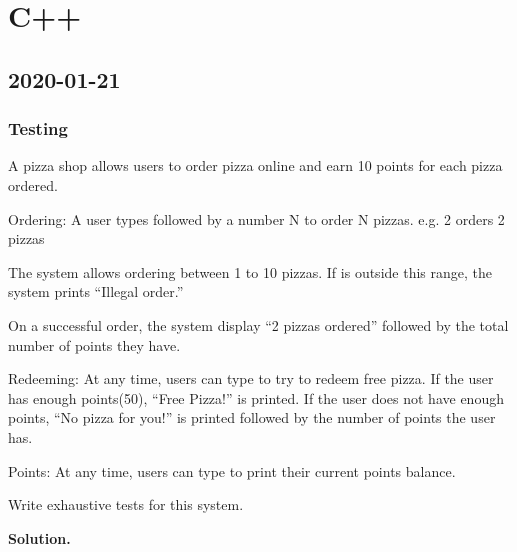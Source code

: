 \chapter{C++}
\section{2020-01-21}
\subsection{Testing}
A pizza shop allows users to order pizza online and earn 10 points for each pizza
ordered.

Ordering: A user types  followed by a number N to order N pizzas.
e.g.  2 orders 2 pizzas

The system allows ordering between 1 to 10 pizzas.
If  is outside this range, the system prints ``Illegal order.''

On a successful order, the system display ``2 pizzas ordered''
followed by the total number of points they have.

Redeeming: At any time, users can type  to try to redeem free pizza.
If the user has enough points(50), ``Free Pizza!'' is printed.
If the user does not have enough points, ``No pizza for you!''
is printed followed by the number of points the user has.

Points: At any time, users can type  to print their current points balance.

Write exhaustive tests for this system.

\textbf{Solution.}

